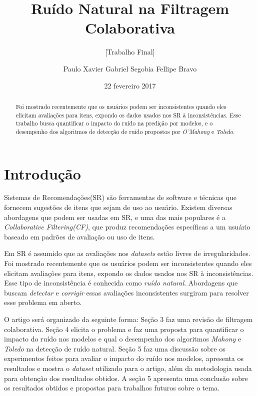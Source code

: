 \documentclass{sig-alternate}
\begin{document}
\title{Ruído Natural na Filtragem Colaborativa}
\subtitle{[Trabalho Final]}


\author{
\alignauthor
    Paulo Xavier
\alignauthor
    Gabriel Segobia
\alignauthor
    Fellipe Bravo
}
\additionalauthors{}
\date{22 fevereiro 2017}

\maketitle

\begin{abstract}
Foi mostrado recentemente que os usuários podem ser inconsistentes quando eles elicitam avaliações para itens, expondo os dados usados nos SR à inconsistências. Esse trabalho busca quantificar o impacto do ruído na predição por modelos, e o desempenho dos algoritmos de detecção de ruído propostos por \emph{O'Mahony} e \emph{Toledo}.
\end{abstract}

\section{Introdução}

Sistemas de Recomendações(SR) são ferramentas de software e técnicas que fornecem sugestões de itens que sejam de uso ao usuário. Existem diversas abordagens que podem ser usadas em SR, e uma das mais populares é a \emph{Collaborative Filtering(CF)}, que produz recomendações específicas a um usuário baseado em padrões de avaliação ou uso de itens.

Em SR é assumido que as avaliações nos \emph{datasets} estão livres de irregularidades. Foi mostrado recentemente que os usuários podem ser inconsistentes quando eles elicitam avaliações para itens, expondo os dados usados nos SR à inconsistências. Esse tipo de inconsistência é conhecida como \emph{ruído natural}. Abordagens que buscam \emph{detectar} e \emph{corrigir} essas avaliações inconsistentes surgiram para resolver esse problema em aberto.

O artigo será organizado da seguinte forma: Seção 3 faz uma revisão de filtragem colaborativa. Seção 4 elicita o problema e faz uma proposta para quantificar o impacto do ruído nos modelos e qual o desempenho dos algoritmos \emph{Mahony} e \emph{Toledo} na detecção de ruído natural. Seção 5 faz uma discussão sobre os experimentos feitos para avaliar o impacto do ruído nos modelos, apresenta os resultados e mostra o \emph{dataset} utilizado para o artigo, além da metodologia usada para obtenção dos resultados obtidos. A seção 5 apresenta uma conclusão sobre os resultados obtidos e propostas para trabalhos futuros sobre o tema.
\end{document}
